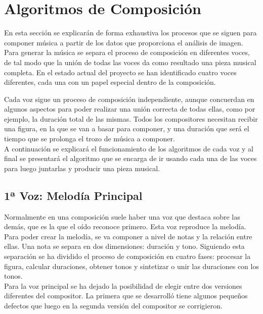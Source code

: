 \section{Algoritmos de Composición}
\label{sec:algComposicion}


En esta sección se explicarán de forma exhaustiva los procesos que se siguen para componer música a partir de los datos que proporciona el análisis de imagen.\\

Para generar la música se separa el proceso de composición en diferentes voces, de tal modo que la unión de todas las voces da como resultado una pieza musical completa. En el estado actual del proyecto se han identificado cuatro voces diferentes, cada una con un papel especial dentro de la composición. 

Cada voz sigue un proceso de composición independiente, aunque concuerdan en algunos aspectos para poder realizar una unión correcta de todas ellas, como por ejemplo, la duración total de las mismas. Todos los compositores necesitan recibir una figura, en la que se van a basar para componer, y una duración que será el tiempo que se prolonga el trozo de música a componer.\\

A continuación se explicará el funcionamiento de los algoritmos de cada voz y al final se presentará el algoritmo que se encarga de ir usando cada una de las voces para luego juntarlas y producir una pieza musical.

\subsection{1ª Voz: Melodía Principal}

Normalmente en una composición suele haber una voz que destaca sobre las demás, que es la que el oído reconoce primero. Esta voz reproduce la melodía. Para poder crear la melodía, se va componer a nivel de notas y la relación entre ellas. Una nota se separa en dos dimensiones: duración y tono. Siguiendo esta separación se ha dividido el proceso de composición en cuatro fases: procesar la figura, calcular duraciones, obtener tonos y sintetizar o unir las duraciones con los tonos.\\
Para la voz principal se ha dejado la posibilidad de elegir entre dos versiones diferentes del compositor. La primera que se desarrolló tiene algunos pequeños defectos que luego en la segunda versión del compositor se corrigieron.\\

